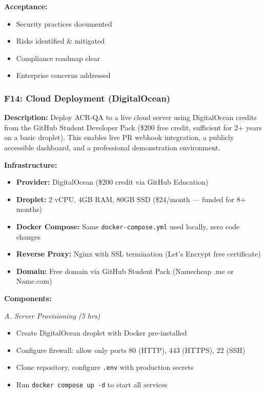 \documentclass[11pt,a4paper]{article}
\begin{document}
\textbf{Acceptance:}
\begin{itemize}[leftmargin=*]
    \item[$\checkmark$] Security practices documented
    \item[$\checkmark$] Risks identified \& mitigated
    \item[$\checkmark$] Compliance roadmap clear
    \item[$\checkmark$] Enterprise concerns addressed
\end{itemize}

\subsubsection{F14: Cloud Deployment (DigitalOcean)}
\textbf{Description:} Deploy ACR-QA to a live cloud server using DigitalOcean credits from the GitHub Student Developer Pack (\$200 free credit, sufficient for 2+ years on a basic droplet). This enables live PR webhook integration, a publicly accessible dashboard, and a professional demonstration environment.

\textbf{Infrastructure:}
\begin{itemize}[leftmargin=*]
    \item \textbf{Provider:} DigitalOcean (\$200 credit via GitHub Education)
    \item \textbf{Droplet:} 2 vCPU, 4GB RAM, 80GB SSD (\$24/month --- funded for 8+ months)
    \item \textbf{Docker Compose:} Same \texttt{docker-compose.yml} used locally, zero code changes
    \item \textbf{Reverse Proxy:} Nginx with SSL termination (Let's Encrypt free certificate)
    \item \textbf{Domain:} Free domain via GitHub Student Pack (Namecheap .me or Name.com)
\end{itemize}

\textbf{Components:}

\textit{A. Server Provisioning (5 hrs)}
\begin{itemize}[leftmargin=*]
    \item Create DigitalOcean droplet with Docker pre-installed
    \item Configure firewall: allow only ports 80 (HTTP), 443 (HTTPS), 22 (SSH)
    \item Clone repository, configure \texttt{.env} with production secrets
    \item Run \texttt{docker compose up -d} to start all services
\end{itemize}
\end{document}
